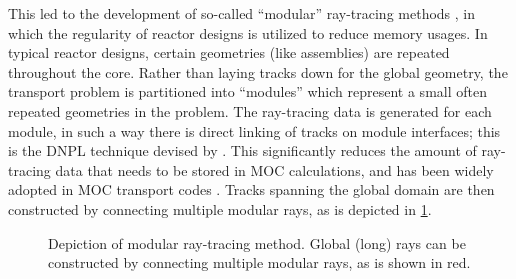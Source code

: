 {{{      This led to the development of so-called ``modular'' ray-tracing methods \cite{Filippone1980,Saji2000,Wu2003,Kochunas2013}, in which the regularity of reactor designs is utilized to reduce memory usages.
      In typical reactor designs, certain geometries (like assemblies) are repeated throughout the core.
      Rather than laying tracks down for the global geometry, the transport problem is partitioned into ``modules'' which represent a small often repeated geometries in the problem.
      The ray-tracing data is generated for each module, in such a way there is direct linking of tracks on module interfaces; this is the \ac{DNPL} technique devised by \citet{Saji2000}.
      This significantly reduces the amount of ray-tracing data that needs to be stored in \ac{MOC} calculations, and has been widely adopted in \ac{MOC} transport codes \cite{Hong1998,Jung2009,Tang2009,DeCART,APOLLO3,MPACT2016,Hebert2017a}.
      Tracks spanning the global domain are then constructed by connecting multiple modular rays, as is depicted in \cref{fig:MRT:Modular Ray Tracing}.

      \begin{figure}[h]
          \centering
          \def\svgwidth{0.4\linewidth}
          
          \caption{Depiction of modular ray-tracing method. Global (long) rays can be constructed by connecting multiple modular rays, as is shown in red.}
          \label{fig:MRT:Modular Ray Tracing}
      \end{figure}

}}}

